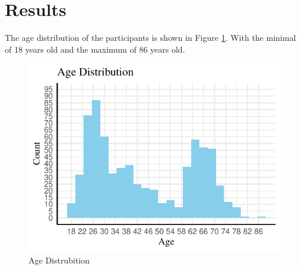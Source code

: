 \documentclass[
  man,floatsintext]{apa6}
\begin{document}
\hypertarget{results}{%
\section{Results}\label{results}}

The age distribution of the participants is shown in Figure \ref{fig:agedis}. With the minimal of 18 years old and the maximum of 86 years old.

\begin{figure}
\centering
\includegraphics{Exploring-the-Role-of-Deviance-on-Self-Concept-Clarity-Across-the-Lifespan-_files/figure-latex/agedis-1.pdf}
\caption{\label{fig:agedis}Age Distrubition}
\end{figure}
\end{document}

